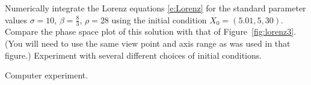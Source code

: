 \documentclass{ximera}
\begin{document}
\begin{exercise} \label{c11.4.3a}
Numerically integrate the Lorenz equations \eqref{e:Lorenz} for the standard 
parameter values $\sigma=10$, $\beta=\frac{8}{3}$, $\rho=28$ using the initial 
condition $X_0 =(5.01,5,30)$.  Compare the phase space plot of this solution 
with that of Figure~\ref{fig:lorenz3}.  (You will need to use the same view
point and axis range as was used in that figure.)  Experiment with several 
different choices of initial conditions.

\begin{solution}
Computer experiment.

\end{solution}
\end{exercise}
\end{document}
